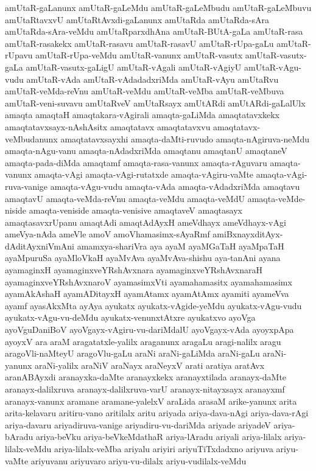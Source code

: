 {amUtaR-gaLanunx
amUtaR-gaLeMdu
amUtaR-gaLeMbudu
amUtaR-gaLeMbuvu
amUtaRtavxvU
amUtaRtAvxdi-gaLanunx
amUtaRda
amUtaRda-sAra
amUtaRda-sAra-veMdu
amUtaRparxdhAna
amUtaR-BUtA-gaLa
amUtaR-rasa
amUtaR-rasakekx
amUtaR-rasavu
amUtaR-rasavU
amUtaR-rUpa-gaLu
amUtaR-rUpavu
amUtaR-rUpa-veMdu
amUtaR-vanunx
amUtaR-vasutx
amUtaR-vasutx-gaLa
amUtaR-vasutx-gaLigU
amUtaR-vAgali
amUtaR-vAgiyU
amUtaR-vAgu-vudu
amUtaR-vAda
amUtaR-vAdadadxriMda
amUtaR-vAyu
amUtaRvu
amUtaR-veMda-reVnu
amUtaR-veMdu
amUtaR-veMba
amUtaR-veMbuva
amUtaR-veni-suvavu
amUtaRveV
amUtaRsayx
amUtARdi
amUtARdi-gaLalUlx
amaqta
amaqtaH
amaqtakara-vAgirali
amaqta-gaLiMda
amaqtatavxkekx
amaqtatavxsayx-nAshAsitx
amaqtatavx
amaqtatavxvu
amaqtatavx-veMbudanunx
amaqtatavxsayxhi
amaqta-daMti-ruvudo
amaqta-nAgiruva-neMdu
amaqta-nAgu-vanu
amaqta-nAdadxriMda
amaqtanu
amaqtanU
amaqtaneV
amaqta-pada-diMda
amaqtamf
amaqta-rasa-vanunx
amaqta-rAguvaru
amaqta-vanunx
amaqta-vAgi
amaqta-vAgi-rutatxde
amaqta-vAgiru-vaMte
amaqta-vAgi-ruva-vanige
amaqta-vAgu-vudu
amaqta-vAda
amaqta-vAdadxriMda
amaqtavu
amaqtavU
amaqta-veMda-reVnu
amaqta-veMdu
amaqta-veMdU
amaqta-veMde-niside
amaqta-veniside
amaqta-venisive
amaqtaveV
amaqtasayx
amaqtasavxrUpanu
amaqtAdi
amaqtAdAyxH
ameVdhayx
ameVdhayx-vAgi
ameVya-nAda
ameVle
amoV
amoVhamasimx-sAyaRmf
amiBxnayxditAyx-dAditAyxniVmAni
amamxya-shariVra
aya
ayaM
ayaMGaTaH
ayaMpaTaH
ayaMpuruSa
ayaMloVkaH
ayaMvAva
ayaMvAva-shishu
aya-tanAni
ayana
ayamaginxH
ayamaginxveYRshAvxnara
ayamaginxveYRshAvxnaraH
ayamaginxveYRshAvxnaroV
ayamasimxVti
ayamahamasitx
ayamahamasimx
ayamAkAshaH
ayamADitayxH
ayamAtamx
ayamAtAmx
ayamiti
ayameVva
ayamf
ayasAkxMta
ayAya
ayukatx
ayukatx-vAgide-yeMdu
ayukatx-vAgu-vudu
ayukatx-vAgu-vu-deMdu
ayukatx-venunxtAtxre
ayukatxvo
ayoVga
ayoVguDaniBoV
ayoVgayx-vAgiru-vu-dariMdalU
ayoVgayx-vAda
ayoyxpApa
ayoyxV
ara
araM
aragatatxle-yalilx
araganunx
aragaLu
aragi-nalilx
aragu
aragoVli-naMteyU
aragoVlu-gaLu
araNi
araNi-gaLiMda
araNi-gaLu
araNi-yanunx
araNi-yalilx
araNiV
araNayx
araNeyxV
arati
aratiya
aratAvx
aranABAyxdi
aranayxka-daMte
aranayxkekx
aranayxtilada
aranayx-daMte
aranayx-dalilxruva
aranayx-dalilxruva-varU
aranayx-nitayxsayx
aranayxmf
aranayx-vanunx
aramane
aramane-yalelxV
araLida
arasaM
arike-yanunx
arita
arita-kelavaru
aritiru-vano
aritilalx
aritu
ariyada
ariya-dava-nAgi
ariya-dava-rAgi
ariya-davaru
ariyadiruva-vanige
ariyadiru-vu-dariMda
ariyade
ariyadeV
ariya-bAradu
ariya-beVku
ariya-beVkeMdathaR
ariya-lAradu
ariyali
ariya-lilalx
ariya-lilalx-veMdu
ariya-lilalx-veMba
ariyalu
ariyiri
ariyuTiTxdadxno
ariyuva
ariyu-vaMte
ariyuvanu
ariyuvaro
ariyu-vu-dilalx
ariyu-vudilalx-veMdu
}
